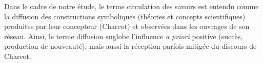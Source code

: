 Dans le cadre de notre étude, le terme \og{}circulation des savoirs\fg{} est entendu comme la diffusion des constructions symboliques (théories et concepts scientifiques) produites par leur concepteur (Charcot) et observées dans les ouvrages de son réseau. Ainsi, le terme \og{}diffusion\fg{} englobe l'influence \textit{a priori} positive (\og{}succès\fg{}, \og{}production de nouveauté\fg{}), mais aussi la réception parfois mitigée du discours de Charcot.

%
